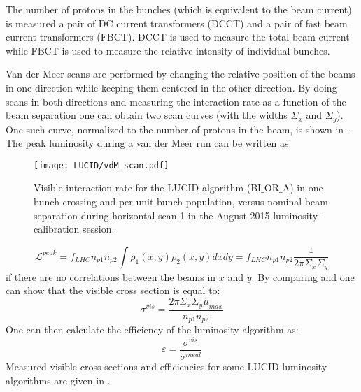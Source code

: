 The number of protons in the bunches (which is equivalent to the beam current) is measured a pair of DC current transformers (DCCT) and a pair of fast beam current transformers (FBCT). 
DCCT is used to measure the total beam current while FBCT is used to measure the relative intensity of individual bunches.

Van der Meer scans are performed by changing the relative position of the beams in one direction while keeping them centered in the other direction.
By doing scans in both directions and measuring the interaction rate as a function of the beam separation one can obtain two scan curves (with the widths $\Sigma_{x}$ and $\Sigma_{y}$). 
One such curve, normalized to the number of protons in the beam, is shown in .
The peak luminosity during a van der Meer run can be written as:
\begin{figure}
\centering
\texttt{[image: LUCID/vdM\_scan.pdf]}
\caption{Visible interaction rate for the LUCID algorithm (BI$\_$OR$\_$A) in one bunch crossing and per unit bunch population, 
	 versus nominal beam separation during horizontal scan 1 in the August 2015 luminosity-calibration session. }
\label{fig:vdmScanCurve}
\end{figure}
\begin{equation}
\mathscr{L}^{peak} = f_{LHC} n_{p1} n_{p2} \int \rho_{1}(x,y) \rho_{2}(x,y) dx dy =  f_{LHC} n_{p1} n_{p2} \dfrac{1}{2\pi \Sigma_{x} \Sigma_{y}}
\label{eq:lumi_vdm}
\end{equation}
if there are no correlations between the beams in $x$ and $y$.
By comparing  and  one can show that the visible cross section is equal to:
\begin{equation}
\sigma^{vis} = \dfrac{ 2 \pi \Sigma_{x} \Sigma_{y} \mu_{max}  }{ n_{p1} n_{p2} }
\label{eq:sigma_vis}
\end{equation}
One can then calculate the efficiency of the luminosity algorithm as:
\begin{equation}
\varepsilon = \dfrac{\sigma^{vis}}{\sigma^{ineal}}
\label{eq:alg_method_eff}
\end{equation}
Measured visible cross sections and efficiencies for some LUCID luminosity algorithms are given in .
% 
